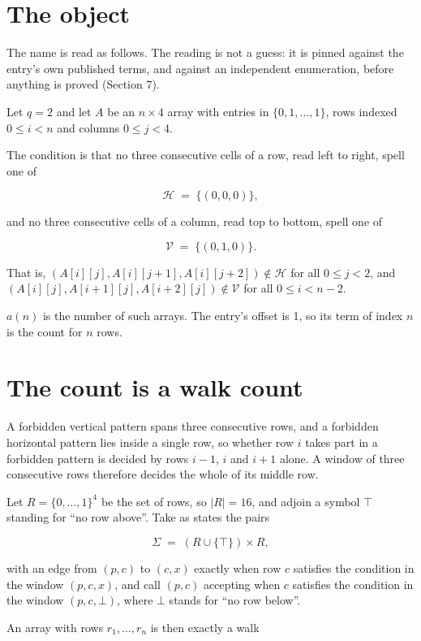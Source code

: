 \documentclass[11pt]{article}
\theoremstyle{definition}
\begin{document}
\section{The object}

The name is read as follows. The reading is not a guess: it is pinned against the entry's own published terms, and against an independent enumeration, before anything is proved (Section 7).

Let $q = 2$ and let $A$ be an $n \times 4$ array with entries in $\{0,1,\dots,1\}$, rows indexed $0 \le i < n$ and columns $0 \le j < 4$.

The condition is that no three consecutive cells of a row, read left to right, spell one of

\[\mathcal{H} \;=\; \{(0,0,0)\},\]

and no three consecutive cells of a column, read top to bottom, spell one of

\[\mathcal{V} \;=\; \{(0,1,0)\}.\]

That is, $(A[i][j],A[i][j{+}1],A[i][j{+}2]) \notin \mathcal{H}$ for all $0 \le j < 2$, and $(A[i][j],A[i{+}1][j],A[i{+}2][j]) \notin \mathcal{V}$ for all $0 \le i < n-2$.

$a(n)$ is the number of such arrays. The entry's offset is 1, so its term of index $n$ is the count for $n$ rows.

\section{The count is a walk count}

A forbidden vertical pattern spans three consecutive rows, and a forbidden horizontal pattern lies inside a single row, so whether row $i$ takes part in a forbidden pattern is decided by rows $i-1$, $i$ and $i+1$ alone. A window of three consecutive rows therefore decides the whole of its middle row.

Let $R = \{0,\dots,1\}^{4}$ be the set of rows, so $|R| = 16$, and adjoin a symbol $\top$ standing for ``no row above''. Take as states the pairs

\[\Sigma \;=\; (R \cup \{\top\}) \times R,\]

with an edge from $(p,c)$ to $(c,x)$ exactly when row $c$ satisfies the condition in the window $(p,c,x)$, and call $(p,c)$ accepting when $c$ satisfies the condition in the window $(p,c,\bot)$, where $\bot$ stands for ``no row below''.

An array with rows $r_1,\dots,r_n$ is then exactly a walk
\end{document}
